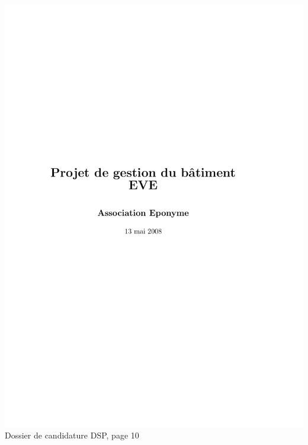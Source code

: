 \includegraphics[scale=0.85,trim=20mm 20mm 20mm 20mm,clip,page=10]{annexes/candidature_dsp.pdf} \\
Dossier de candidature DSP, page 10
\newpage
